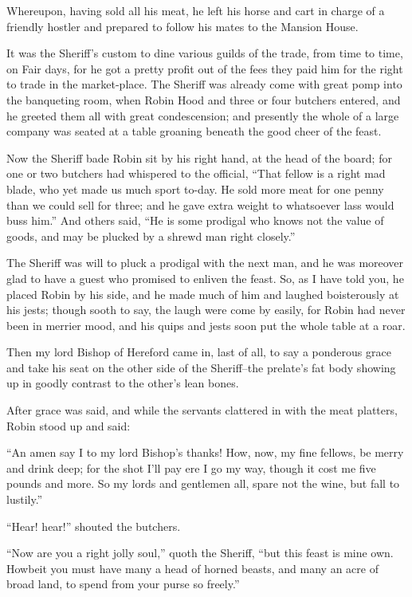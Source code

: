 Whereupon, having sold all his meat, he left his horse and cart in
charge of a friendly hostler and prepared to follow his mates to the
Mansion House.

It was the Sheriff's custom to dine various guilds of the trade, from
time to time, on Fair days, for he got a pretty profit out of the fees
they paid him for the right to trade in the market-place. The Sheriff
was already come with great pomp into the banqueting room, when Robin
Hood and three or four butchers entered, and he greeted them all with
great condescension; and presently the whole of a large company was
seated at a table groaning beneath the good cheer of the feast.

Now the Sheriff bade Robin sit by his right hand, at the head of the
board; for one or two butchers had whispered to the official, ``That
fellow is a right mad blade, who yet made us much sport to-day. He sold
more meat for one penny than we could sell for three; and he gave extra
weight to whatsoever lass would buss him.'' And others said, ``He is
some prodigal who knows not the value of goods, and may be plucked by a
shrewd man right closely.''

The Sheriff was will to pluck a prodigal with the next man, and he was
moreover glad to have a guest who promised to enliven the feast. So, as
I have told you, he placed Robin by his side, and he made much of him
and laughed boisterously at his jests; though sooth to say, the laugh
were come by easily, for Robin had never been in merrier mood, and his
quips and jests soon put the whole table at a roar.

Then my lord Bishop of Hereford came in, last of all, to say a ponderous
grace and take his seat on the other side of the Sheriff--the prelate's
fat body showing up in goodly contrast to the other's lean bones.

After grace was said, and while the servants clattered in with the meat
platters, Robin stood up and said:

``An amen say I to my lord Bishop's thanks! How, now, my fine fellows,
be merry and drink deep; for the shot I'll pay ere I go my way, though
it cost me five pounds and more. So my lords and gentlemen all, spare
not the wine, but fall to lustily.''

``Hear! hear!'' shouted the butchers.

``Now are you a right jolly soul,'' quoth the Sheriff, ``but this feast
is mine own. Howbeit you must have many a head of horned beasts, and
many an acre of broad land, to spend from your purse so freely.''

